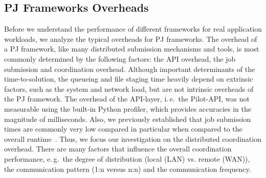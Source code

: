 \documentclass[conference]{IEEEtran}
\begin{document}

\subsection{PJ Frameworks Overheads}\label{sec:pj_performance}

 


Before we understand the performance of different frameworks for real
application workloads, we analyze the typical overheads for PJ frameworks.
 The overhead of a PJ framework, like many
distributed submission mechanisms and tools, is most commonly determined by
the following factors: the API overhead, the job submission and coordination
overhead. Although important determinants of the time-to-solution, the
queueing and file staging time heavily depend on extrinsic factors, such as
the system and network load, but are not intrinsic overheads of the PJ
framework. The overhead of the API-layer, i.\,e.\ the Pilot-API, was not 
measurable using the built-in Python profiler, which provides accuracies in 
the magnitude of milliseconds. Also, we previously established that job 
submission times are commonly very low compared in particular when compared to 
the overall runtime~\cite{saga_europar10}.  Thus, we focus our investigation on the distributed coordination overhead. There are many factors
that influence the overall coordination performance, e.\,g.\ the
degree of distribution (local (LAN) vs. remote (WAN)), the
communication pattern (1:n versus n:n) and the communication
frequency.
\end{document}
